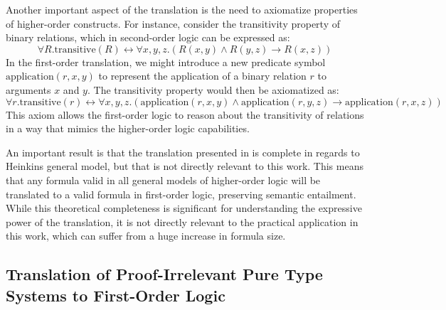 Another important aspect of the translation is the need to axiomatize properties of higher-order constructs. 
For instance, consider the transitivity property of binary relations, which in second-order logic can be expressed as:
\[
\forall R.\text{transitive}(R) \leftrightarrow \forall x,y,z.(R(x,y) \wedge R(y,z) \rightarrow R(x,z))
\]
In the first-order translation, we might introduce a new predicate symbol $\text{application}(r,x,y)$ to represent the application of a binary relation $r$ to arguments $x$ and $y$. 
The transitivity property would then be axiomatized as:
\[
\forall r.\text{transitive}(r) \leftrightarrow \forall x,y,z.(\text{application}(r,x,y) \wedge \text{application}(r,y,z) \rightarrow \text{application}(r,x,z))
\]
This axiom allows the first-order logic to reason about the transitivity of relations in a way that mimics the higher-order logic capabilities.

An important result is that the translation presented in \cite{kerber1990provecompleteembedding} is complete in regards to Heinkins general model, but that is not directly relevant to this work.
This means that any formula valid in all general models of higher-order logic will be translated to a valid formula in first-order logic, preserving semantic entailment. 
While this theoretical completeness is significant for understanding the expressive power of the translation, it is not directly relevant to the practical application in this work, which can suffer from a huge increase in formula size.

\subsection{Translation of Proof-Irrelevant Pure Type Systems to First-Order Logic}

